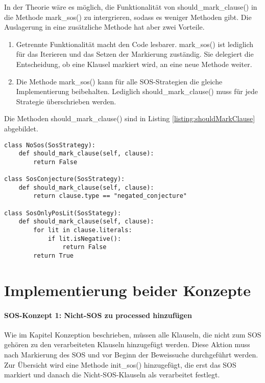 In der Theorie wäre es möglich, die Funktionalität von should\_mark\_clause() in die Methode mark\_sos() zu intergrieren, sodass es weniger Methoden gibt. Die Auslagerung in eine zusätzliche Methode hat aber zwei Vorteile.
\begin{enumerate}
	\item Getrennte Funktionalität macht den Code lesbarer. mark\_sos() ist lediglich für das Iterieren und das Setzen der Markierung zuständig. Sie delegiert die Entscheidung, ob eine Klausel markiert wird, an eine neue Methode weiter.
	\item Die Methode mark\_sos() kann für alle SOS-Strategien die gleiche Implementierung beibehalten. Lediglich should\_mark\_clause() muss für jede Strategie überschrieben werden.
\end{enumerate}

Die Methoden should\_mark\_clause() sind in Listing \ref{listing:shouldMarkClause} abgebildet.
\begin{lstlisting}[caption={Markierungsmethoden für drei der vier SOS-Strategien. Die Klasse SosOnlyNegLit wurde weggelassen, da sie die gleiche Codestuktur wie SosOnlyPosLit besitzt.}, label={listing:shouldMarkClause}]
class NoSos(SosStrategy):
	def should_mark_clause(self, clause):
		return False

class SosConjecture(SosStrategy):
	def should_mark_clause(self, clause):
		return clause.type == "negated_conjecture"
		
class SosOnlyPosLit(SosStategy):
    def should_mark_clause(self, clause):
		for lit in clause.literals:
			if lit.isNegative():
				return False
		return True
\end{lstlisting}


\section{Implementierung beider Konzepte}

\paragraph{SOS-Konzept 1: Nicht-SOS zu processed hinzufügen}

Wie im Kapitel Konzeption beschrieben, müssen alle Klauseln, die nicht zum SOS gehören zu den verarbeiteten Klauseln hinzugefügt werden. Diese Aktion muss nach Markierung des SOS und vor Beginn der Beweissuche durchgeführt werden. Zur Übersicht wird eine Methode init\_sos() hinzugefügt, die erst das SOS markiert und danach die Nicht-SOS-Klauseln als verarbeitet festlegt.

